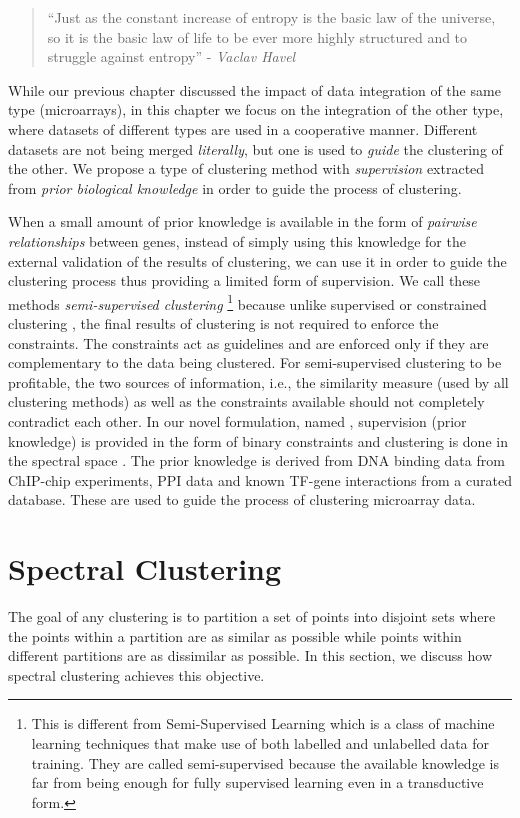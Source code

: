 \begin{quote} ``Just as the constant increase of entropy is the basic law of the universe, so it is the basic law of life to be ever more highly structured and to struggle against entropy'' - \textit{Vaclav Havel}  \end{quote} 
 
While our previous chapter discussed the impact of data integration of the same type (microarrays), in this chapter we focus on the integration of the other type, where datasets of different types are used in a cooperative manner. Different datasets are not being merged \textit{literally}, but one is used to \textit{guide} the clustering of the other. We propose a type of clustering method with \textit{supervision} extracted from \textit{prior biological knowledge} in order to guide the process of clustering.

When a small amount of prior knowledge is available in the form of \textit{pairwise relationships} between genes, instead of simply using this knowledge for the external validation of the results of clustering, we can use it in order to guide the clustering process thus providing a limited form of supervision. We call these methods \textit{semi-supervised clustering} \footnote{This is different from Semi-Supervised Learning \citep{grira2005unsupsurvey} which is a class of machine learning techniques that make use of both labelled and unlabelled data for training. They are called semi-supervised because the available knowledge is far from being enough for fully supervised learning even in a transductive form.} because unlike supervised or constrained clustering \citep{bradley00constrained}, the final results of clustering is not required to enforce the constraints. The constraints act as guidelines and are enforced only if they are complementary to the data being clustered. For semi-supervised clustering to be profitable, the two sources of information, i.e., the similarity measure (used by all clustering methods) as well as the constraints available should not completely contradict each other.
In our novel formulation, named , supervision (prior knowledge) is provided in the form of binary constraints and clustering is done in the spectral space \citep{shi00normalized, ng2001onspectral}. The prior knowledge is derived from DNA binding data from ChIP-chip experiments, PPI data and known TF-gene interactions from a curated database. These are used to guide the process of clustering microarray data.

\section{Spectral Clustering}
The goal of any clustering is to partition a set of points into disjoint sets where the points within a partition are as similar as possible while points within different partitions are as dissimilar as possible. In this section, we discuss how spectral clustering achieves this objective. 
